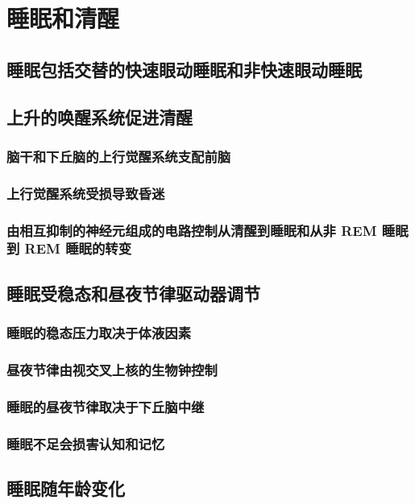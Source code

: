 \chapter{睡眠和清醒}


\section{睡眠包括交替的快速眼动睡眠和非快速眼动睡眠}

\section{上升的唤醒系统促进清醒}
\subsection{脑干和下丘脑的上行觉醒系统支配前脑}
\subsection{上行觉醒系统受损导致昏迷}
\subsection{由相互抑制的神经元组成的电路控制从清醒到睡眠和从非 REM 睡眠到 REM 睡眠的转变}

\section{睡眠受稳态和昼夜节律驱动器调节}
\subsection{睡眠的稳态压力取决于体液因素}
\subsection{昼夜节律由视交叉上核的生物钟控制}
\subsection{睡眠的昼夜节律取决于下丘脑中继}
\subsection{睡眠不足会损害认知和记忆}

\section{睡眠随年龄变化}
